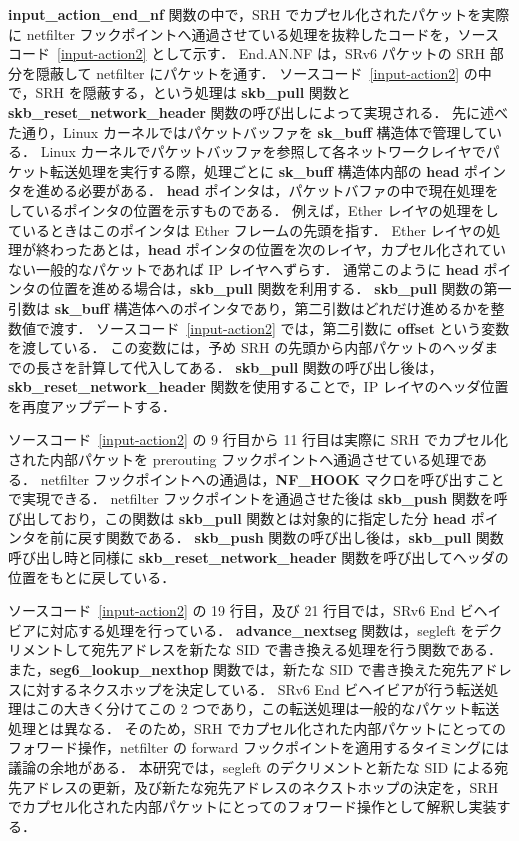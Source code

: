\textbf{input\_action\_end\_nf} 関数の中で，SRH でカプセル化されたパケットを実際に netfilter フックポイントへ通過させている処理を抜粋したコードを，ソースコード~\ref*{input-action2} として示す．
End.AN.NF は，SRv6 パケットの SRH 部分を隠蔽して netfilter にパケットを通す．
ソースコード~\ref*{input-action2} の中で，SRH を隠蔽する，という処理は \textbf{skb\_pull} 関数と \textbf{skb\_reset\_network\_header} 関数の呼び出しによって実現される．
先に述べた通り，Linux カーネルではパケットバッファを \textbf{sk\_buff} 構造体で管理している．
Linux カーネルでパケットバッファを参照して各ネットワークレイヤでパケット転送処理を実行する際，処理ごとに \textbf{sk\_buff} 構造体内部の \textbf{head} ポインタを進める必要がある．
\textbf{head} ポインタは，パケットバファの中で現在処理をしているポインタの位置を示すものである．
例えば，Ether レイヤの処理をしているときはこのポインタは Ether フレームの先頭を指す．
Ether レイヤの処理が終わったあとは，\textbf{head} ポインタの位置を次のレイヤ，カプセル化されていない一般的なパケットであれば IP レイヤへずらす．
通常このように \textbf{head} ポインタの位置を進める場合は，\textbf{skb\_pull} 関数を利用する．
\textbf{skb\_pull} 関数の第一引数は \textbf{sk\_buff} 構造体へのポインタであり，第二引数はどれだけ進めるかを整数値で渡す．
ソースコード~\ref*{input-action2} では，第二引数に \textbf{offset} という変数を渡している．
この変数には，予め SRH の先頭から内部パケットのヘッダまでの長さを計算して代入してある．
\textbf{skb\_pull} 関数の呼び出し後は，\textbf{skb\_reset\_network\_header} 関数を使用することで，IP レイヤのヘッダ位置を再度アップデートする．

ソースコード~\ref*{input-action2} の 9 行目から 11 行目は実際に SRH でカプセル化された内部パケットを prerouting フックポイントへ通過させている処理である．
netfilter フックポイントへの通過は，\textbf{NF\_HOOK} マクロを呼び出すことで実現できる．
netfilter フックポイントを通過させた後は \textbf{skb\_push} 関数を呼び出しており，この関数は \textbf{skb\_pull} 関数とは対象的に指定した分 \textbf{head} ポインタを前に戻す関数である．
\textbf{skb\_push} 関数の呼び出し後は，\textbf{skb\_pull} 関数呼び出し時と同様に \textbf{skb\_reset\_network\_header} 関数を呼び出してヘッダの位置をもとに戻している．

ソースコード~\ref*{input-action2} の 19 行目，及び 21 行目では，SRv6 End ビヘイビアに対応する処理を行っている．
\textbf{advance\_nextseg} 関数は，segleft をデクリメントして宛先アドレスを新たな SID で書き換える処理を行う関数である．
また，\textbf{seg6\_lookup\_nexthop} 関数では，新たな SID で書き換えた宛先アドレスに対するネクスホップを決定している．
SRv6 End ビヘイビアが行う転送処理はこの大きく分けてこの 2 つであり，この転送処理は一般的なパケット転送処理とは異なる．
そのため，SRH でカプセル化された内部パケットにとってのフォワード操作，netfilter の forward フックポイントを適用するタイミングには議論の余地がある．
本研究では，segleft のデクリメントと新たな SID による宛先アドレスの更新，及び新たな宛先アドレスのネクストホップの決定を，SRH でカプセル化された内部パケットにとってのフォワード操作として解釈し実装する．

